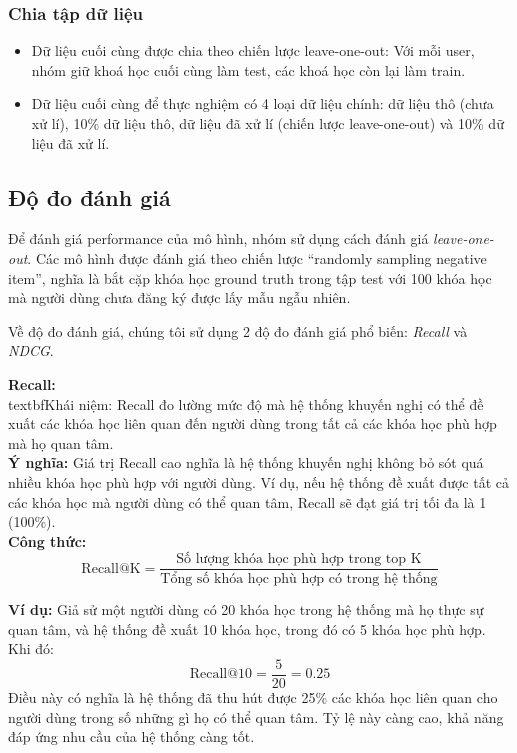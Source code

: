 \subsubsection{Chia tập dữ liệu}
\begin{itemize}
    \item Dữ liệu cuối cùng được chia theo chiến lược leave-one-out: Với mỗi user, nhóm giữ khoá học cuối cùng làm test, các khoá học còn lại làm train. 
    \item Dữ liệu cuối cùng để thực nghiệm có 4 loại dữ liệu chính: dữ liệu thô (chưa xử lí), 10\% dữ liệu thô, dữ liệu đã xử lí (chiến lược leave-one-out) và 10\% dữ liệu đã xử lí.
\end{itemize}

\subsection{Độ đo đánh giá}
Để đánh giá performance của mô hình, nhóm sử dụng cách đánh giá \textit{leave-one-out}. Các mô hình được đánh giá theo chiến lược “randomly sampling negative item”, nghĩa là bắt cặp khóa học ground truth trong tập test với 100 khóa học mà người dùng chưa đăng ký được lấy mẫu ngẫu nhiên.

Về độ đo đánh giá, chúng tôi sử dụng 2 độ đo đánh giá phổ biến: \textit{Recall} và \textit{NDCG}.

\textbf{Recall:} \\
textbf{Khái niệm:} Recall đo lường mức độ mà hệ thống khuyến nghị có thể đề xuất các khóa học liên quan đến người dùng trong tất cả các khóa học phù hợp mà họ quan tâm. \\
\textbf{Ý nghĩa:} Giá trị Recall cao nghĩa là hệ thống khuyến nghị không bỏ sót quá nhiều khóa học phù hợp với người dùng. Ví dụ, nếu hệ thống đề xuất được tất cả các khóa học mà người dùng có thể quan tâm, Recall sẽ đạt giá trị tối đa là 1 (100\%). \\

\textbf{Công thức:}
\[
\text{Recall@K} = \frac{\text{Số lượng khóa học phù hợp trong top K}}{\text{Tổng số khóa học phù hợp có trong hệ thống}}
\]

\textbf{Ví dụ:} Giả sử một người dùng có 20 khóa học trong hệ thống mà họ thực sự quan tâm, và hệ thống đề xuất 10 khóa học, trong đó có 5 khóa học phù hợp. Khi đó:
\[
\text{Recall@10} = \frac{5}{20} = 0.25
\]
Điều này có nghĩa là hệ thống đã thu hút được 25\% các khóa học liên quan cho người dùng trong số những gì họ có thể quan tâm. Tỷ lệ này càng cao, khả năng đáp ứng nhu cầu của hệ thống càng tốt.

